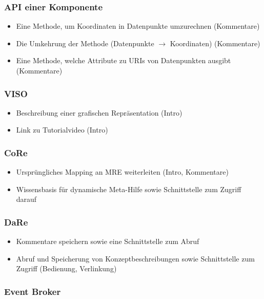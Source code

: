 \documentclass[
	headsepline,
	footsepline,
	fontsize=12pt,
	bibliography=totoc
]{scrbook}
\begin{document}
\subsubsection{API einer Komponente}

\begin{itemize}
	\item Eine Methode, um Koordinaten in Datenpunkte umzurechnen (Kommentare)
	\item Die Umkehrung der Methode (Datenpunkte $\to$ Koordinaten) (Kommentare)
	\item Eine Methode, welche Attribute zu URIs von Datenpunkten ausgibt (Kommentare)
\end{itemize}

\subsubsection{VISO}

\begin{itemize}
	\item Beschreibung einer grafischen Repräsentation (Intro)
	\item Link zu Tutorialvideo (Intro)
\end{itemize}

\subsubsection{CoRe}

\begin{itemize}
	\item Ursprüngliches Mapping an MRE weiterleiten (Intro, Kommentare)
	\item Wissensbasis für dynamische Meta-Hilfe sowie Schnittstelle zum Zugriff darauf
\end{itemize}

\subsubsection{DaRe}

\begin{itemize}
	\item Kommentare speichern sowie eine Schnittstelle zum Abruf
	\item Abruf und Speicherung von Konzeptbeschreibungen sowie Schnittstelle zum Zugriff (Bedienung, Verlinkung)
\end{itemize}

\subsubsection{Event Broker}
\end{document}
